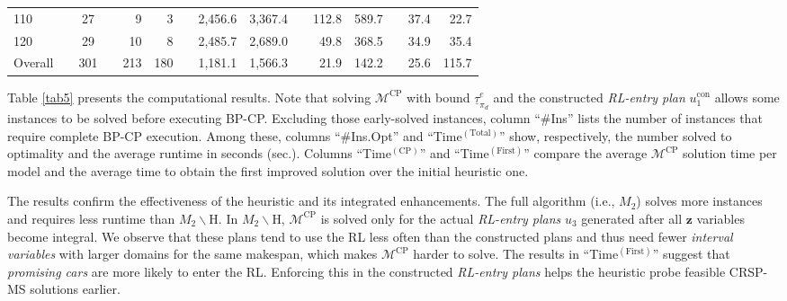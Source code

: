 \documentclass[12pt]{article}
\begin{document}
\begin{table}[htbp]
{\begin{tabular}{lcccrrcrrcrrcrr}
    110   &       & 27    &       & 9     & 3     &       & 2,456.6 & 3,367.4 &       & 112.8 & 589.7 &       & 37.4  & 22.7 \\
    120   &       & 29    &       & 10    & 8     &       & 2,485.7 & 2,689.0  &       & 49.8  & 368.5 &       & 34.9  & 35.4 \\
\cmidrule{1-1}\cmidrule{3-3}\cmidrule{5-6}\cmidrule{8-9}\cmidrule{11-12}\cmidrule{14-15}    Overall &       & 301   &       & 213   & 180   &       & 1,181.1 & 1,566.3 &       & 21.9  & 142.2 &       & 25.6  & 115.7 \\
    \bottomrule
    \end{tabular}
}%
\end{table}

Table \ref{tab5} presents the computational results. Note that solving $\mathcal{M}^{\text{CP}}$ with bound $\underline{\tau}^e_{\pi_d}$ and the constructed \textit{RL-entry plan} $u^{\text{con}}_1$ allows some instances to be solved before executing BP-CP. Excluding those early-solved instances, column ``\#Ins'' lists the number of instances that require complete BP-CP execution. Among these, columns ``\#Ins.Opt'' and ``Time$^{(\text{Total})}$'' show, respectively, the number solved to optimality and the average runtime in seconds (sec.). Columns ``Time$^{(\text{CP})}$'' and ``Time$^{(\text{First})}$'' compare the average $\mathcal{M}^{\text{CP}}$ solution time per model and the average time to obtain the first improved solution over the initial heuristic one.




The results confirm the effectiveness of the heuristic and its integrated enhancements. %
The full algorithm (i.e., $M_2$) solves more instances and requires less runtime than $M_2\backslash$H. In $M_2\backslash$H, $\mathcal{M}^{\text{CP}}$ is solved only for the actual \textit{RL-entry plans} $u_3$ generated after all $\boldsymbol{z}$ variables become integral. %
We observe that these plans tend to use the RL less often than the constructed plans and thus need fewer \textit{interval variables} with larger domains for the same makespan, which makes $\mathcal{M}^{\text{CP}}$ harder to solve. The results in ``Time$^{(\text{First})}$'' suggest that \textit{promising cars} are more likely to enter the RL. Enforcing this in the constructed \textit{RL-entry plans} helps the heuristic probe feasible CRSP-MS solutions earlier.
\end{document}
